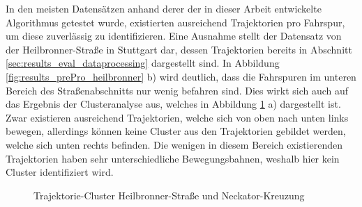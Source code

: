 In den meisten Datensätzen anhand derer der in dieser Arbeit entwickelte Algorithmus getestet wurde,
existierten ausreichend Trajektorien pro Fahrspur, um diese zuverlässig zu identifizieren. Eine Ausnahme
stellt der Datensatz von der Heilbronner-Straße in Stuttgart dar, dessen Trajektorien bereits
in Abschnitt \ref{sec:results_eval_dataprocessing} dargestellt sind. In Abbildung \ref{fig:results_prePro_heilbronner} b)
wird deutlich, dass die Fahrspuren im
unteren Bereich des Straßenabschnitts nur wenig befahren sind. Dies wirkt sich auch auf das Ergebnis
der Clusteranalyse aus, welches in Abbildung \ref{fig:results_clusters} a) dargestellt ist.
Zwar existieren ausreichend Trajektorien, welche sich von oben nach unten links bewegen, allerdings können
keine Cluster aus den Trajektorien gebildet werden, welche sich unten rechts befinden.
Die wenigen in diesem Bereich existierenden Trajektorien haben sehr unterschiedliche Bewegungsbahnen,
weshalb hier kein Cluster identifiziert wird.

\begin{figure}[H]
    \centering
    \caption{Trajektorie-Cluster Heilbronner-Straße und Neckator-Kreuzung}
    \label{fig:results_clusters}
\end{figure}

